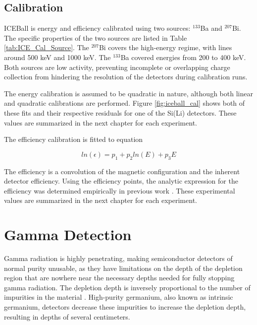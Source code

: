 





\subsection{Calibration}

ICEBall is energy and efficiency calibrated using two sources: $^{133}$Ba and $^{207}$Bi. The specific properties of the two sources are listed in Table \ref{tab:ICE_Cal_Source}. The $^{207}$Bi covers the high-energy regime, with lines around 500 keV and 1000 keV. The $^{133}$Ba covered energies from 200 to 400 keV. Both sources are low activity, preventing incomplete or overlapping charge collection from hindering the resolution of the detectors during calibration runs. 



The energy calibration is assumed to be quadratic in nature, although both linear and quadratic calibrations are performed. Figure \ref{fig:iceball_cal} shows both of these fits and their respective residuals for one of the Si(Li) detectors. These values are summarized in the next chapter for each experiment.



The efficiency calibration is fitted to equation

\begin{equation}
    ln(\epsilon) = p_1+p_2ln(E)+p_3E
    \label{eq:SiLi_Eff}
\end{equation}

The efficiency is a convolution of the magnetic configuration and the inherent detector efficiency. Using the efficiency points, the analytic expression for the efficiency was determined empirically in previous work \citep{battaglia15:_iceball_176lu}. These experimental values are summarized in the next chapter for each experiment.

\section{Gamma Detection}

Gamma radiation is highly penetrating, making semiconductor detectors of normal purity unusable, as they have limitations on the depth of the depletion region that are nowhere near the necessary depths needed for fully stopping gamma radiation. The depletion depth is inversely proportional to the number of impurities in the material \citep{knoll00:rad_det_meas}. High-purity germanium, also known as intrinsic germanium, detectors decrease these impurities to increase the depletion depth, resulting in depths of several centimeters.

